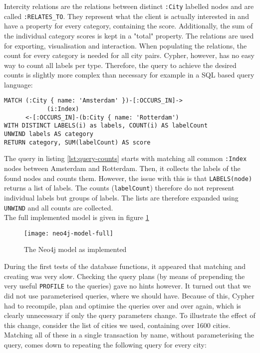 Intercity relations are the relations between distinct \texttt{:City} labelled nodes and are called \texttt{:RELATES\_TO}. They represent what the client is actually interested in and have a property for every category, containing the score. Additionally, the sum of the individual category scores is kept in a "total" property. The relations are used for exporting, visualisation and interaction. When populating the relations, the count for every category is needed for all city pairs. Cypher, however, has no easy way to count all labels per type. Therefore, the query to achieve the desired counts is slightly more complex than necessary for example in a SQL based query language:

\begin{lstlisting}[language=cypher, caption={Counting distinct labels}, label={lst:query-counts}]
MATCH (:City { name: 'Amsterdam' })-[:OCCURS_IN]->
            (i:Index)
      <-[:OCCURS_IN]-(b:City { name: 'Rotterdam')
WITH DISTINCT LABELS(i) as labels, COUNT(i) AS labelCount
UNWIND labels AS category
RETURN category, SUM(labelCount) AS score
\end{lstlisting}

The query in listing \ref{lst:query-counts} starts with matching all common \texttt{:Index} nodes between Amsterdam and Rotterdam. Then, it collects the labels of the found nodes and counts them.
However, the issue with this is that \texttt{LABELS(node)} returns a list of labels. The counts (\texttt{labelCount}) therefore do not represent individual labels but groups of labels. The lists are therefore expanded using \texttt{UNWIND} and all counts are collected.\\

The full implemented model is given in figure \ref{fig:neo4j-model-full}

\begin{figure}[H]
    \centering
    \texttt{[image: neo4j-model-full]}
    \caption{The Neo4j model as implemented}
    \label{fig:neo4j-model-full}
\end{figure}

During the first tests of the database functions, it appeared that matching and creating was very slow. Checking the query plans (by means of prepending the very useful \texttt{PROFILE} to the queries) gave no hints however. It turned out that we did not use parameterised queries, where we should have. Because of this, Cypher had to recompile, plan and optimise the queries over and over again, which is clearly unnecessary if only the query parameters change. To illustrate the effect of this change, consider the list of cities we used, containing over 1600 cities. Matching all of these in a single transaction by name, without parameterising the query, comes down to repeating the following query for every city:

